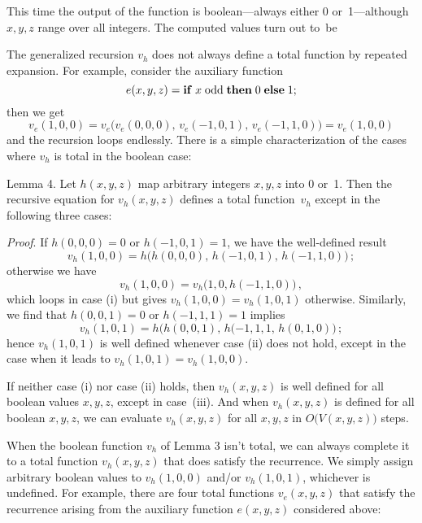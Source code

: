 \smallskip\noindent
This time the output of the function is boolean---always either 0
or~1---although $x,y,z$ range over all integers. The computed values turn
out to~be

\smallskip
{}

\smallskip
The generalized recursion $v_h$ does not always define a total
function by repeated expansion.
For example, consider the auxiliary function
$$e(x,y,z)={\bf if}\; x\;{\rm odd}\;{\bf then}\;0\;{\bf else}\;1;$$
then we get
$$v_e(1,0,0)=v_e\bigl(v_e(0,0,0),\,v_e(-1,0,1),\,v_e(-1,1,0)\bigr)
=v_e(1,0,0)$$
and the recursion loops endlessly. There is a simple characterization
of the cases where $v_h$ is total in the boolean case:

\proclaim Lemma 4. Let $h(x,y,z)$ map arbitrary integers $x,y,z$
into 0 or~1. Then the recursive equation for $v_h(x,y,z)$ defines
a total function~$v_h$ except in the following three cases:


\bigskip\noindent
{\it Proof}.\enspace
If $h(0,0,0)=0$ or $h(-1,0,1)=1$, we have the well-defined result
$$v_h(1,0,0)=h\bigl(h(0,0,0),\,h(-1,0,1),\,h(-1,1,0)\bigr)\,;$$
otherwise we have
$$v_h(1,0,0)=v_h\bigl(1,0,h(-1,1,0)\bigr)\,,$$
which loops in case (i) but gives $v_h(1,0,0)=v_h(1,0,1)$ otherwise.
Similarly, we find that $h(0,0,1)=0$ or $h(-1,1,1)=1$ implies
$$v_h(1,0,1)=h\bigl(h(0,0,1),\,h(-1,1,1,\,h(0,1,0)\bigr)\,;$$
hence $v_h(1,0,1)$ is well defined whenever case (ii) does not hold,
except in the case when it leads to $v_h(1,0,1)=v_h(1,0,0)$.

If neither case (i) nor case (ii) holds, then $v_h(x,y,z)$ is well
defined for all boolean values $x,y,z$, except in case~(iii).
And when $v_h(x,y,z)$ is defined for all boolean $x,y,z$, we can
evaluate $v_h(x,y,z)$ for all $x,y,z$ in $O\bigl(V(x,y,z)\bigr)$
steps.\quad\pfbox

\smallskip
When the boolean function $v_h$ of Lemma 3 isn't total, we can always
complete it to a total function $v_h(x,y,z)$ that does satisfy
the recurrence. We simply assign arbitrary boolean values to
$v_h(1,0,0)$ and/or $v_h(1,0,1)$, whichever is undefined. For example,
there are four total functions $v_e(x,y,z)$ that satisfy the
recurrence
 arising from the auxiliary function $e(x,y,z)$ considered above:

